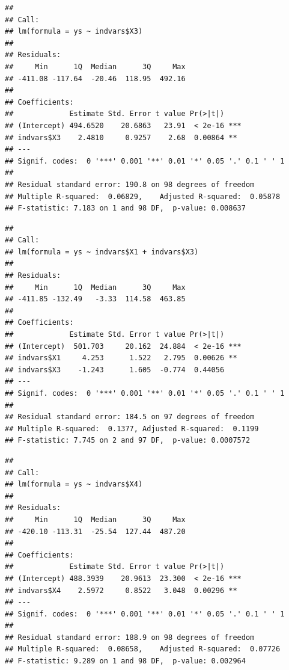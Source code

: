 \documentclass[
]{book}
\newenvironment{Shaded}{\begin{snugshade}}{\end{snugshade}}
\newcommand{\FunctionTok}[1]{\textcolor[rgb]{0.13,0.29,0.53}{\textbf{#1}}}
\newcommand{\NormalTok}[1]{#1}
\newcommand{\OtherTok}[1]{\textcolor[rgb]{0.56,0.35,0.01}{#1}}
\newcommand{\SpecialCharTok}[1]{\textcolor[rgb]{0.81,0.36,0.00}{\textbf{#1}}}
\begin{document}
\begin{verbatim}
## 
## Call:
## lm(formula = ys ~ indvars$X3)
## 
## Residuals:
##     Min      1Q  Median      3Q     Max 
## -411.08 -117.64  -20.46  118.95  492.16 
## 
## Coefficients:
##             Estimate Std. Error t value Pr(>|t|)    
## (Intercept) 494.6520    20.6863   23.91  < 2e-16 ***
## indvars$X3    2.4810     0.9257    2.68  0.00864 ** 
## ---
## Signif. codes:  0 '***' 0.001 '**' 0.01 '*' 0.05 '.' 0.1 ' ' 1
## 
## Residual standard error: 190.8 on 98 degrees of freedom
## Multiple R-squared:  0.06829,    Adjusted R-squared:  0.05878 
## F-statistic: 7.183 on 1 and 98 DF,  p-value: 0.008637
\end{verbatim}

\begin{Shaded}
\end{Shaded}

\begin{verbatim}
## 
## Call:
## lm(formula = ys ~ indvars$X1 + indvars$X3)
## 
## Residuals:
##     Min      1Q  Median      3Q     Max 
## -411.85 -132.49   -3.33  114.58  463.85 
## 
## Coefficients:
##             Estimate Std. Error t value Pr(>|t|)    
## (Intercept)  501.703     20.162  24.884  < 2e-16 ***
## indvars$X1     4.253      1.522   2.795  0.00626 ** 
## indvars$X3    -1.243      1.605  -0.774  0.44056    
## ---
## Signif. codes:  0 '***' 0.001 '**' 0.01 '*' 0.05 '.' 0.1 ' ' 1
## 
## Residual standard error: 184.5 on 97 degrees of freedom
## Multiple R-squared:  0.1377, Adjusted R-squared:  0.1199 
## F-statistic: 7.745 on 2 and 97 DF,  p-value: 0.0007572
\end{verbatim}

\begin{Shaded}
\end{Shaded}

\begin{verbatim}
## 
## Call:
## lm(formula = ys ~ indvars$X4)
## 
## Residuals:
##     Min      1Q  Median      3Q     Max 
## -420.10 -113.31  -25.54  127.44  487.20 
## 
## Coefficients:
##             Estimate Std. Error t value Pr(>|t|)    
## (Intercept) 488.3939    20.9613  23.300  < 2e-16 ***
## indvars$X4    2.5972     0.8522   3.048  0.00296 ** 
## ---
## Signif. codes:  0 '***' 0.001 '**' 0.01 '*' 0.05 '.' 0.1 ' ' 1
## 
## Residual standard error: 188.9 on 98 degrees of freedom
## Multiple R-squared:  0.08658,    Adjusted R-squared:  0.07726 
## F-statistic: 9.289 on 1 and 98 DF,  p-value: 0.002964
\end{verbatim}
\end{document}
